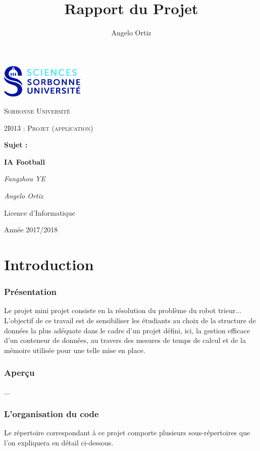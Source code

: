 \documentclass[12pt,a4paper]{article}
\author{Angelo Ortiz}
\title{Rapport du Projet}
\begin{document}
\begin{titlepage}
  \centering
  \includegraphics[width=0.30\textwidth]{logo.jpg}\par\vspace{1cm}
  {\scshape\LARGE Sorbonne Universit\'e\par}
  \vspace{1cm}
  {\scshape\Large 2I013 : Projet (application)\par}
  \vspace{1.5cm}
  {\Large \bfseries Sujet :\par}
  {\huge\bfseries IA Football\par}
  \vspace{2cm}
  {\Large\itshape Fangzhou YE\par}
  {\Large\itshape Angelo Ortiz\par}
  \vfill
  
  {\large Licence d'Informatique\par}
  {\large Ann\'ee 2017/2018\par}
\end{titlepage}
 
\tableofcontents
  
\newpage
  
\part*{Introduction}
\section*{Pr\'esentation}
Le projet mini projet consiste en la r\'esolution du probl\`eme du robot 
trieur...
L’objectif de ce travail est de sensibiliser les étudiants au choix de la structure de données la plus adéquate dans le cadre d’un projet défini, ici, la gestion efficace d’un conteneur de données, au travers des mesures de temps de calcul et de la mémoire utilisée pour une telle mise en place.
\section*{Aper\c{c}u}
...
\section*{L'organisation du code}
Le r\'epertoire correspondant \`a ce projet comporte plusieurs 
sous-r\'epertoires que l'on expliquera en d\'etail ci-dessous.
\end{document}
